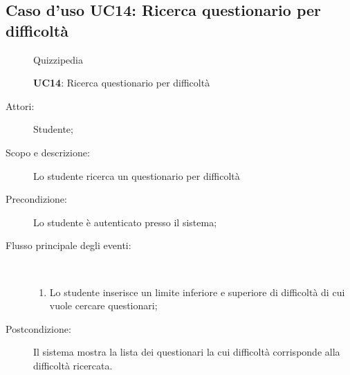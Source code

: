 \subsection{Caso d'uso UC14: Ricerca questionario per difficoltà}
	\begin{figure}[H]
		\centering
		\begin{resizedtikzpicture}{\textwidth}
		\begin{umlsystem}[x=0, fill=lightgray!20]{Quizzipedia}
		\end{umlsystem}
		\end{resizedtikzpicture}
		\caption{\textbf{UC14}: Ricerca questionario per difficoltà}
		\label{UC14}
	\end{figure}
\begin{description}
\item[Attori:] Studente;
\item[Scopo e descrizione:] Lo studente ricerca un questionario per difficoltà
      \item[Precondizione:] Lo studente è autenticato presso il sistema;

        \item[Flusso principale degli eventi:] \ 
 \begin{enumerate}
          \item Lo studente inserisce un limite inferiore e superiore di difficoltà di cui vuole cercare questionari;

      \end{enumerate}
    \item[Postcondizione:] Il sistema mostra la lista dei questionari la cui difficoltà corrisponde alla difficoltà ricercata.
  \end{description}
\hypertarget{UC15}{}
